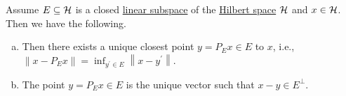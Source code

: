 \begin{theorem}\label{thm:orthogonality-principle}
	Assume \(E\subseteq \mathcal{\MakeUppercase{h}} \) is a closed \hyperref[def:linear-vector-space]{linear subspace} of the \hyperref[def:Hilbert-space]{Hilbert space} \(\mathcal{\MakeUppercase{h}} \) and \(x\in \mathcal{\MakeUppercase{h}} \). Then we have the following.
	\begin{enumerate}[(a)]
		\item Then there exists a unique closest point \(y = P_E x\in E\) to \(x\), i.e., \(\left\lVert x - P_E x\right\rVert = \inf _{y^\prime \in E} \left\lVert x - y^\prime \right\rVert \).
		\item The point \(y = P_E x\in E\) is the unique vector such that \(x - y\in E^{\perp}\).
	\end{enumerate}
	\begin{center}
	\end{center}
\end{theorem}
